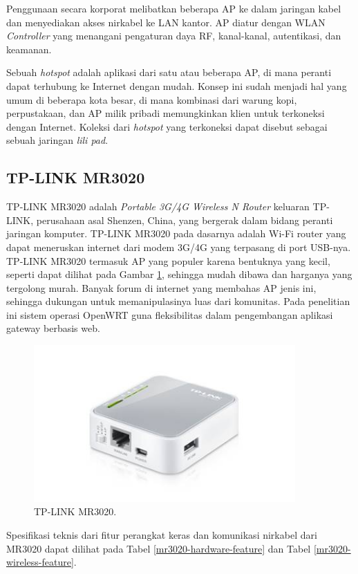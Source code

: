     Penggunaan secara korporat melibatkan beberapa AP ke dalam jaringan kabel dan menyediakan akses nirkabel ke LAN kantor. AP diatur dengan WLAN \emph{Controller} yang menangani pengaturan daya RF, kanal-kanal, autentikasi, dan keamanan.
    
    Sebuah \emph{hotspot} adalah aplikasi dari satu atau beberapa AP, di mana peranti dapat terhubung ke Internet dengan mudah. Konsep ini sudah menjadi hal yang umum di beberapa kota besar, di mana kombinasi dari warung kopi, perpustakaan, dan AP milik pribadi memungkinkan klien untuk terkoneksi dengan Internet. Koleksi dari \emph{hotspot} yang terkoneksi dapat disebut sebagai sebuah jaringan \emph{lili pad}.

  \subsection{TP-LINK MR3020}
    TP-LINK MR3020 adalah \emph{Portable 3G/4G Wireless N Router} keluaran TP-LINK, perusahaan asal Shenzen, China, yang bergerak dalam bidang peranti jaringan komputer. TP-LINK MR3020 pada dasarnya adalah Wi-Fi router yang dapat meneruskan internet dari modem 3G/4G yang terpasang di port USB-nya. TP-LINK MR3020 termasuk AP yang populer karena bentuknya yang kecil, seperti dapat dilihat pada Gambar \ref{mr3020}, sehingga mudah dibawa dan harganya yang tergolong murah. Banyak forum di internet yang membahas AP jenis ini, sehingga dukungan untuk memanipulasinya luas dari komunitas. Pada penelitian ini sistem operasi OpenWRT guna fleksibilitas dalam pengembangan aplikasi gateway berbasis web.

    \begin{figure}[htp!]
      \centering
        \includegraphics[width=10cm]{gambar/mr3020}
        \caption{TP-LINK MR3020.}
        \label{mr3020}
    \end{figure}

    Spesifikasi teknis dari fitur perangkat keras dan komunikasi nirkabel dari MR3020 dapat dilihat pada Tabel \ref{mr3020-hardware-feature} dan Tabel \ref{mr3020-wireless-feature}.

